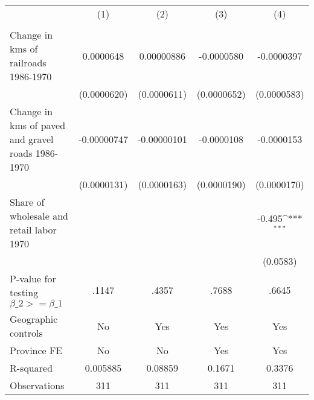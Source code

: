 {
\def\sym#1{\ifmmode^{#1}\else\(^{#1}\)\fi}
\begin{tabular}{l*{4}{c}}
\hline\hline
                &\multicolumn{1}{c}{(1)}&\multicolumn{1}{c}{(2)}&\multicolumn{1}{c}{(3)}&\multicolumn{1}{c}{(4)}\\
                &\multicolumn{1}{c}{}&\multicolumn{1}{c}{}&\multicolumn{1}{c}{}&\multicolumn{1}{c}{}\\
\hline
Change in kms of railroads 1986-1970&0.0000648         &0.00000886         &-0.0000580         &-0.0000397         \\
                &(0.0000620)         &(0.0000611)         &(0.0000652)         &(0.0000583)         \\
[1em]
Change in kms of paved and gravel roads 1986-1970&-0.00000747         &-0.00000101         &-0.0000108         &-0.0000153         \\
                &(0.0000131)         &(0.0000163)         &(0.0000190)         &(0.0000170)         \\
[1em]
Share of wholesale and retail labor 1970&                  &                  &                  &   -0.495\sym{***}\\
                &                  &                  &                  & (0.0583)         \\
\hline
P-value for testing $\beta\_{2} >= \beta\_{1}$&    .1147         &    .4357         &    .7688         &    .6645         \\
Geographic controls&       No         &      Yes         &      Yes         &      Yes         \\
Province FE     &       No         &       No         &      Yes         &      Yes         \\
R-squared       & 0.005885         &  0.08859         &   0.1671         &   0.3376         \\
Observations    &      311         &      311         &      311         &      311         \\
\hline\hline
\end{tabular}
}
